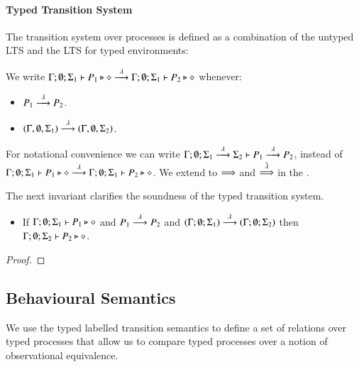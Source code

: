 \paragraph{Typed Transition System}

The transition system over processes is defined as a combination
of the untyped LTS and the LTS for typed environments:

\begin{definition}\rm
	We write $\Gamma; \emptyset; \Sigma_1 \vdash P_1 \triangleright \diamond \stackrel{\lambda}{\longrightarrow} \Gamma; \emptyset; \Sigma_1 \vdash P_2 \triangleright \diamond$
	whenever:
	\begin{itemize}
		\item	$P_1 \stackrel{\lambda}{\longrightarrow} P_2$.
		\item	$(\Gamma, \emptyset, \Sigma_1) \stackrel{\lambda}{\longrightarrow} (\Gamma, \emptyset, \Sigma_2)$.
	\end{itemize}
\end{definition}

For notational convenience we can write
$\Gamma; \emptyset; \Sigma_1 \stackrel{\lambda}{\longrightarrow} \Sigma_2 \vdash P_1 \stackrel{\lambda}{\longrightarrow} P_2$,
instead of $\Gamma; \emptyset; \Sigma_1 \vdash P_1 \triangleright \diamond \stackrel{\lambda}{\longrightarrow} \Gamma; \emptyset; \Sigma_1 \vdash P_2 \triangleright \diamond$.
We extend to $\stackrel{}{\Longrightarrow}$ and $\stackrel{\hat{\lambda}}{\Longrightarrow}$ in the .

The next invariant clarifies the soundness of the
typed transition system.

\begin{lemma}[Invariant]
	\begin{itemize}
		\item	If $\Gamma; \emptyset; \Sigma_1 \vdash P_1 \triangleright \diamond$ and
			$P_1 \stackrel{\lambda}{\longrightarrow} P_2$ and $(\Gamma; \emptyset; \Sigma_1) \stackrel{\lambda}{\longrightarrow} (\Gamma; \emptyset; \Sigma_2)$
			then $\Gamma; \emptyset; \Sigma_2 \vdash P_2 \triangleright \diamond$.
	\end{itemize}
\end{lemma}

\begin{proof}
\end{proof}

\subsection{Behavioural Semantics}

We use the typed labelled transition semantics to define
a set of relations over typed processes that allow us to compare
typed processes over a notion of observational equivalence.


